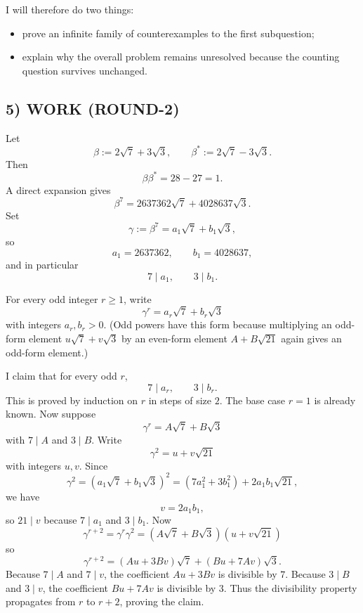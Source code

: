 I will therefore do two things:
\begin{itemize}
\item prove an infinite family of counterexamples to the first subquestion;
\item explain why the overall problem remains unresolved because the counting question survives unchanged.
\end{itemize}

\subsection*{5) WORK (ROUND-2)}
Let
\[
\beta:=2\sqrt{7}+3\sqrt{3},\qquad \beta^{\ast}:=2\sqrt{7}-3\sqrt{3}.
\]
Then
\[
\beta\beta^{\ast}=28-27=1.
\]
A direct expansion gives
\[
\beta^7=2637362\sqrt{7}+4028637\sqrt{3}.
\]
Set
\[
\gamma:=\beta^7=a_1\sqrt{7}+b_1\sqrt{3},
\]
so
\[
a_1=2637362,\qquad b_1=4028637,
\]
and in particular
\[
7\mid a_1,\qquad 3\mid b_1.
\]

For every odd integer $r\ge 1$, write
\[
\gamma^r=a_r\sqrt{7}+b_r\sqrt{3}
\]
with integers $a_r,b_r>0$. (Odd powers have this form because multiplying an odd-form element $u\sqrt7+v\sqrt3$ by an even-form element $A+B\sqrt{21}$ again gives an odd-form element.)

I claim that for every odd $r$,
\[
7\mid a_r,\qquad 3\mid b_r.
\]
This is proved by induction on $r$ in steps of size $2$.
The base case $r=1$ is already known.
Now suppose
\[
\gamma^r=A\sqrt7+B\sqrt3
\]
with $7\mid A$ and $3\mid B$.
Write
\[
\gamma^2=u+v\sqrt{21}
\]
with integers $u,v$. Since
\[
\gamma^2=(a_1\sqrt7+b_1\sqrt3)^2=(7a_1^2+3b_1^2)+2a_1b_1\sqrt{21},
\]
we have
\[
v=2a_1b_1,
\]
so $21\mid v$ because $7\mid a_1$ and $3\mid b_1$.
Now
\[
\gamma^{r+2}=\gamma^r\gamma^2=(A\sqrt7+B\sqrt3)(u+v\sqrt{21})
\]
so
\[
\gamma^{r+2}=(Au+3Bv)\sqrt7+(Bu+7Av)\sqrt3.
\]
Because $7\mid A$ and $7\mid v$, the coefficient $Au+3Bv$ is divisible by $7$.
Because $3\mid B$ and $3\mid v$, the coefficient $Bu+7Av$ is divisible by $3$.
Thus the divisibility property propagates from $r$ to $r+2$, proving the claim.

